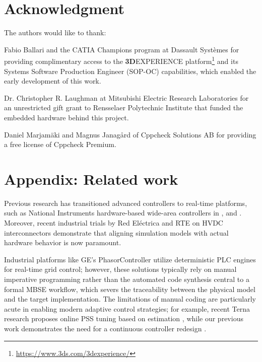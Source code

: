 \section*{Acknowledgment}

The authors would like to thank:

\squishlist
    \item Fabio Ballari and the CATIA\regtm{} Champions program at Dassault Systèmes\regtm{} for providing complimentary access to the \textbf{3D}EXPERIENCE\regtm{} platform\footnote{\tiny{\url{https://www.3ds.com/3dexperience/}}} and its Systems Software Production Engineer (SOP-OC) capabilities, which enabled the early development of this work.
    \item Dr. Christopher R. Laughman at Mitsubishi Electric\regtm{} Research Laboratories for an unrestricted gift grant to Rensselaer Polytechnic Institute\regtm{} that funded the embedded hardware behind this project.
    \item Daniel Marjamäki and Magnus Janagård of Cppcheck Solutions AB for providing a free license of Cppcheck Premium.
\squishend

\section*{Appendix: Related work}

Previous research has transitioned advanced controllers to real-time platforms, such as National Instruments hardware-based wide-area controllers in \cite{Vanfretti2018_Audur}, \cite{epri} and \cite{Schoenwald2017}. Moreover, recent industrial trials by Red Eléctrica and RTE on HVDC interconnectors \cite{Renedo2023} demonstrate that aligning simulation models with actual hardware behavior is now paramount. 

Industrial platforms like GE's PhasorController \cite{Golshani2021} utilize deterministic PLC engines for real-time grid control; however, these solutions typically rely on manual imperative programming rather than the automated code synthesis central to a formal MBSE workflow, which severs the traceability between the physical model and the target implementation. The limitations of manual coding are particularly acute in enabling modern adaptive control strategies; for example, recent Terna research proposes online PSS tuning based on estimation \cite{Lauria2024_SEGAN}, while our previous work demonstrates the need for a continuous controller redesign \cite{Bombois2024, Vanfretti2024_IFAC}.


